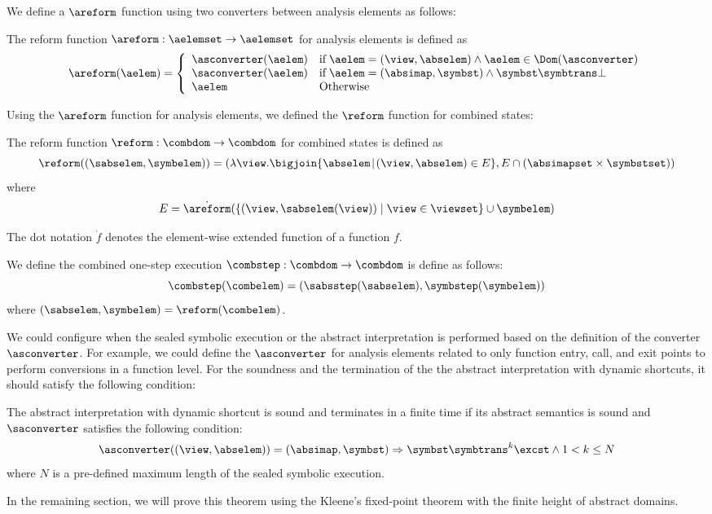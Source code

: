 We define a $\areform$ function using two converters between analysis elements
as follows:
\begin{definition}[$\areform$]\label{def:areform}
  The reform function $\areform: \aelemset \rightarrow \aelemset$ for analysis
  elements is defined as
  \[
    \areform(\aelem) = \left\{
      \begin{array}{ll}
        \asconverter(\aelem)
        & \text{if} \; \aelem = (\view, \abselem) \wedge \aelem \in
        \Dom(\asconverter)\\
        \saconverter(\aelem)
        & \text{if} \; \aelem = (\absimap, \symbst) \wedge \symbst \symbtrans
        \bot\\
        \aelem
        & \text{Otherwise}
      \end{array}
    \right.
  \]
\end{definition}
Using the $\areform$ function for analysis elements, we defined the $\reform$
function for combined states:
\begin{definition}[$\reform$]\label{def:reform}
  The reform function $\reform: \combdom \rightarrow \combdom$ for combined
  states is defined as
  \[
    \reform((\sabselem, \symbelem)) = \left(
      \lambda \view. \bigjoin \{ \abselem \!\mid\! (\view, \abselem) \in E \},
      E \cap (\absimapset \times \symbstset)
    \right)
  \]
  where
  \[
    E = \dot{\areform}(\{ (\view, \sabselem(\view)) \mid \view \in \viewset \} \cup \symbelem)
  \]
\end{definition}
The dot notation $\dot{f}$ denotes the element-wise extended function of a
function $f$.

\begin{definition}
  We define the combined one-step execution $\combstep: \combdom \rightarrow
  \combdom$ is define as follows:
  \[
    \combstep(\combelem) = (
      \sabsstep(\sabselem),
      \symbstep(\symbelem)
    )
  \]
  where $(\sabselem, \symbelem) = \reform(\combelem)$.
\end{definition}

We could configure when the sealed symbolic execution or the abstract
interpretation is performed based on the definition of the converter
$\asconverter$.  For example, we could define the $\asconverter$ for analysis
elements related to only function entry, call, and exit points to perform
conversions in a function level.  For the soundness and the termination of the
the abstract interpretation with dynamic shortcuts, it should satisfy the
following condition:
\begin{theorem}\label{theorem:shortcut}
  The abstract interpretation with dynamic shortcut is sound and terminates in a
  finite time if its abstract semantics is sound and $\saconverter$ satisfies the
  following condition:
  \begin{equation}\label{equ:asc-cond}
    \asconverter((\view, \abselem)) = (\absimap, \symbst) \Rightarrow
    \symbst \symbtrans^k \excst \wedge 1 < k \leq N
  \end{equation}
  where $N$ is a pre-defined maximum length of the sealed symbolic execution.
\end{theorem}

In the remaining section, we will prove this theorem using the Kleene's
fixed-point theorem with the finite height of abstract domains.
